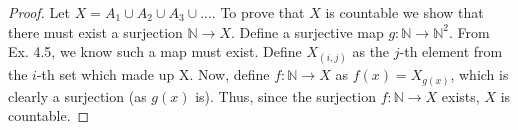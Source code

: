 \documentclass{article}
\begin{document}
\begin{proof}

    Let $X = A_1 \cup A_2 \cup A_3 \cup ...$. To prove that $X$ is countable we show that there must exist
    a surjection $\mathbb{N} \rightarrow X$. Define a surjective map $g: \mathbb{N} \rightarrow \mathbb{N}^2$.
    From Ex. 4.5, we know such a map must exist. Define $X_{(i, j)}$ as the $j$-th element from the
    $i$-th set which made up X. Now, define $f: \mathbb{N} \rightarrow X$ as $f(x) = X_{g(x)}$,
    which is clearly a surjection (as $g(x)$ is).
    Thus, since the surjection $f: \mathbb{N} \rightarrow X$ exists, $X$ is countable.
\end{proof}
\end{document}
